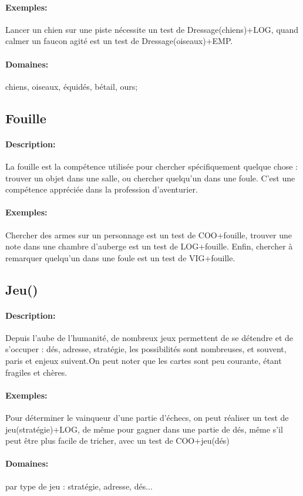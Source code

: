 \documentclass[10pt,a4paper,twocolumn]{book}
\begin{document}
\paragraph{Exemples:}Lancer un chien sur une piste nécessite un test de Dressage(chiens)+LOG, quand calmer un faucon agité est un test de Dressage(oiseaux)+EMP.
\paragraph{Domaines:}chiens, oiseaux, équidés, bétail, ours;
\subsection{Fouille}
\paragraph{Description:}La fouille est la compétence utilisée pour chercher spécifiquement quelque chose : trouver un objet dans une salle, ou chercher quelqu'un dans une foule. C'est une compétence appréciée dans la profession d'aventurier.
\paragraph{Exemples:}Chercher des armes sur un personnage est un test de COO+fouille, trouver une note dans une chambre d'auberge est un test de LOG+fouille. Enfin, chercher à remarquer quelqu'un dans une foule est un test de VIG+fouille.
\subsection{Jeu()}
\paragraph{Description:}Depuis l'aube de l'humanité, de nombreux jeux permettent de se détendre et de s'occuper : dés, adresse, stratégie, les possibilités sont nombreuses, et souvent, paris et enjeux suivent.On peut noter que les cartes sont peu courante, étant fragiles et chères.
\paragraph{Exemples:}Pour déterminer le vainqueur d'une partie d'échecs, on peut réaliser un test de jeu(stratégie)+LOG, de même pour gagner dans une partie de dés, même s'il peut être plus facile de tricher, avec un test de COO+jeu(dés)
\paragraph{Domaines:}par type de jeu : stratégie, adresse, dés...
\end{document}
